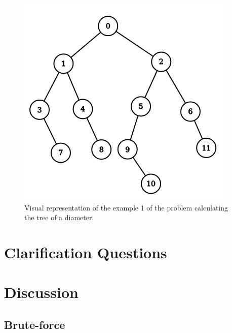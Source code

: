 \begin{figure}
	\centering
	\includegraphics[scale=0.4]{sources/tree_diameter/images/example1}
	\caption{Visual representation of the example $1$ of the problem calculating the tree of a diameter.}
	\label{fig:tree_diameter:example1}
\end{figure}


\section{Clarification Questions}

\begin{QandA}
	\item 
	\begin{answered}
		\textit{}
	\end{answered}
	
\end{QandA}

\section{Discussion}
\label{tree_diameter:sec:discussion}


\subsection{Brute-force}
\label{tree_diameter:sec:bruteforce}



